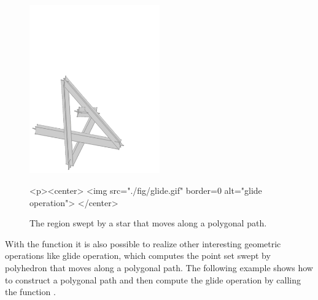 \begin{figure}
  \begin{ccTexOnly}
    \begin{center}
      \includegraphics[width=0.5\textwidth]{Minkowski_sum_3/fig/glide}
    \end{center}
  \end{ccTexOnly}
  \begin{ccHtmlOnly}
    <p><center>
    <img src="./fig/glide.gif" border=0 alt="glide operation">
    </center>
  \end{ccHtmlOnly}
  \caption{The region swept by a star that moves along a polygonal path.}
\end{figure}

With the function  it is also possible to realize
other interesting geometric operations like glide operation, which
computes the point set swept by polyhedron that moves along a
polygonal path. The following example shows how to construct a
polygonal path and then compute the glide operation by calling the
function .


